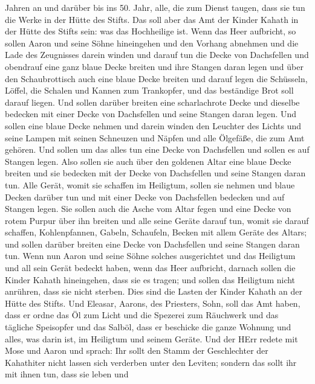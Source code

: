 Jahren an und darüber bis ins 50. Jahr, alle, die zum Dienst taugen,
dass sie tun die Werke in der Hütte des Stifts.  Das soll
aber das Amt der Kinder Kahath in der Hütte des Stifts sein: was das
Hochheilige ist.  Wenn das Heer aufbricht, so sollen Aaron
und seine Söhne hineingehen und den Vorhang abnehmen und die Lade des
Zeugnisses darein winden  und darauf tun die Decke von
Dachsfellen und obendrauf eine ganz blaue Decke breiten und ihre Stangen
daran legen  und über den Schaubrottisch auch eine blaue
Decke breiten und darauf legen die Schüsseln, Löffel, die Schalen und
Kannen zum Trankopfer, und das beständige Brot soll darauf liegen.
 Und sollen darüber breiten eine scharlachrote Decke und
dieselbe bedecken mit einer Decke von Dachsfellen und seine Stangen
daran legen.  Und sollen eine blaue Decke nehmen und darein
winden den Leuchter des Lichts und seine Lampen mit seinen Schneuzen und
Näpfen und alle Ölgefäße, die zum Amt gehören.  Und sollen
um das alles tun eine Decke von Dachsfellen und sollen es auf Stangen
legen.  Also sollen sie auch über den goldenen Altar eine
blaue Decke breiten und sie bedecken mit der Decke von Dachsfellen und
seine Stangen daran tun.  Alle Gerät, womit sie schaffen im
Heiligtum, sollen sie nehmen und blaue Decken darüber tun und mit einer
Decke von Dachsfellen bedecken und auf Stangen legen.  Sie
sollen auch die Asche vom Altar fegen und eine Decke von rotem Purpur
über ihn breiten  und alle seine Geräte darauf tun, womit
sie darauf schaffen, Kohlenpfannen, Gabeln, Schaufeln, Becken mit allem
Geräte des Altars; und sollen darüber breiten eine Decke von Dachsfellen
und seine Stangen daran tun.  Wenn nun Aaron und seine
Söhne solches ausgerichtet und das Heiligtum und all sein Gerät bedeckt
haben, wenn das Heer aufbricht, darnach sollen die Kinder Kahath
hineingehen, dass sie es tragen; und sollen das Heiligtum nicht
anrühren, dass sie nicht sterben. Dies sind die Lasten der Kinder Kahath
an der Hütte des Stifts.  Und Eleasar, Aarons, des
Priesters, Sohn, soll das Amt haben, dass er ordne das Öl zum Licht und
die Spezerei zum Räuchwerk und das tägliche Speisopfer und das Salböl,
dass er beschicke die ganze Wohnung und alles, was darin ist, im
Heiligtum und seinem Geräte.  Und der HErr redete mit Mose
und Aaron und sprach:  Ihr sollt den Stamm der Geschlechter
der Kahathiter nicht lassen sich verderben unter den Leviten;
 sondern das sollt ihr mit ihnen tun, dass sie leben und
